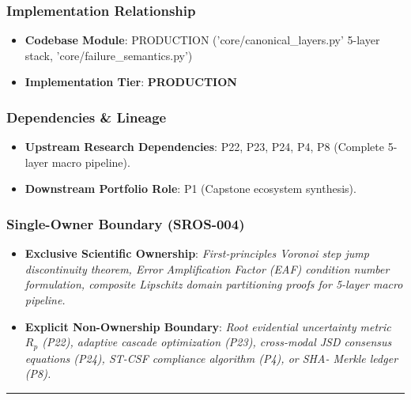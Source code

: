 \documentclass[11pt,letterpaper]{article}
\begin{document}
\subsubsection{Implementation Relationship}
\begin{itemize}[leftmargin=*]
    \item \raggedright \textbf{Codebase Module}: PRODUCTION ('core/\allowbreak canonical\_\allowbreak layers.py' 5-\allowbreak layer stack, 'core/\allowbreak failure\_\allowbreak semantics.py')
    \item \textbf{Implementation Tier}: \textbf{PRODUCTION}
\end{itemize}

\subsubsection{Dependencies \& Lineage}
\begin{itemize}[leftmargin=*]
    \item \textbf{Upstream Research Dependencies}: P22, P23, P24, P4, P8 (Complete 5-\allowbreak layer macro pipeline).
    \item \textbf{Downstream Portfolio Role}: P1 (Capstone ecosystem synthesis).
\end{itemize}

\subsubsection{Single-Owner Boundary (SROS-004)}
\begin{itemize}[leftmargin=*]
    \item \textbf{Exclusive Scientific Ownership}: \textit{First-\allowbreak principles Voronoi step jump discontinuity theorem, Error Amplification Factor (EAF) condition number formulation, composite Lipschitz domain partitioning proofs for 5-\allowbreak layer macro pipeline.}
    \item \textbf{Explicit Non-Ownership Boundary}: \textit{Root evidential uncertainty metric $R_p$ (P22), adaptive cascade optimization (P23), cross-\allowbreak modal JSD consensus equations (P24), ST-\allowbreak CSF compliance algorithm (P4), or SHA- Merkle ledger (P8).}
\end{itemize}

\vspace{0.4cm}
\hrule

\end{document}
